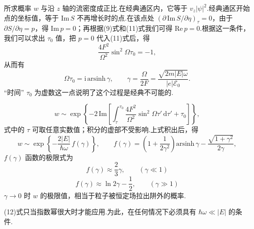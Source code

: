 \begin{xiti}
所求概率 $w$ 与沿 $z$ 轴的流密度成正比.在经典通区内，它等于 $v_z|\psi|^{2}$.经典通区开始点的坐标值，等于 $\mathrm{Im}\,S$ 不再增长时的点.在该点处 $(\partial\,\mathrm{Im}\,S/\partial\eta)_\tau=0$，由于 $\partial S/\partial\eta=p$，得 $\mathrm{Im}\,p=0$；再根据(9)式和(11)式我们可得 $\mathrm{Re}\,p=0$.根据这一条件，我们可以求出 $\tau_0$ 值，把 $p=0$ 代入(11)式后，得
\begin{equation*}
  \frac{4F^{2}}{\Omega^{2}}\sin^{2}\Omega\tau_0=-1,
\end{equation*}
从而有
\begin{equation*}
  \Omega\tau_0=\mathrm{i}\,\mathrm{arsinh}\,\gamma,
  \qquad
  \gamma=\frac{\Omega}{2F}=\frac{\sqrt{2m|E|\omega}}{|e|\mathcal{E}_0}.
\end{equation*}
“时间” $\tau_0$ 为虚数这一点说明了这个过程是经典不可能的.

\begin{equation*}
  w\sim\exp\left\{-2\,\mathrm{Im}
  \left[\int_{\tau}^{\tau_0}\frac{4F^{2}}{\Omega^{2}}\sin^{2}\Omega\tau'\,\mathrm{d}\tau'
  +\tau_0\right]\right\},
\end{equation*}
式中的 $\tau$ 可取任意实数值；积分的虚部不受影响.上式积出后，得
\begin{equation}
  w\sim\exp\left\{-\frac{2|E|}{\hbar\omega}\,f(\gamma)\right\},
  \qquad
  f(\gamma)=\left(1+\frac{1}{2\gamma^{2}}\right)\mathrm{arsinh}\,\gamma
  -\frac{\sqrt{1+\gamma^{2}}}{2\gamma},
\end{equation}
$f(\gamma)$ 函数的极限式为
\begin{equation*}
  f(\gamma)\approx\frac{2}{3}\gamma,
  \qquad(\gamma\ll1)
\end{equation*}
\begin{equation*}
  f(\gamma)\approx\ln 2\gamma-\frac{1}{2},
  \qquad(\gamma\gg1)
\end{equation*}
$\gamma\rightarrow0$ 时 $w$ 的极限值，相当于粒子被恒定场拉出阱外的概率.

(12)式只当指数幂很大时才能应用.为此，在任何情况下必须具有 $\hbar\omega\ll|E|$ 的条件.

\end{xiti}
\renewcommand{\theequation}{\arabic{section}.\arabic{equation}}%
